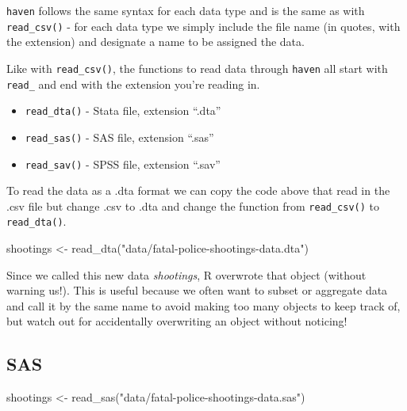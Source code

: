 \documentclass[
]{krantz}
\makeatletter
\newenvironment{Shaded}{\begin{snugshade}}{\end{snugshade}}
\newcommand{\FunctionTok}[1]{\textcolor[rgb]{0,0,0}{#1}}
\newcommand{\NormalTok}[1]{#1}
\newcommand{\OtherTok}[1]{\textcolor[rgb]{0.37,0.37,0.37}{#1}}
\newcommand{\StringTok}[1]{\textcolor[rgb]{0.5,0.5,0.5}{#1}}
\providecommand{\tightlist}{%
  \setlength{\itemsep}{0pt}\setlength{\parskip}{0pt}}
\newenvironment{kframe}{%
\medskip{}
\setlength{\fboxsep}{.8em}
 \def\at@end@of@kframe{}%
 \ifinner\ifhmode%
  \def\at@end@of@kframe{\end{minipage}}%
  \begin{minipage}{\columnwidth}%
 \fi\fi%
 \def\FrameCommand##1{\hskip\@totalleftmargin \hskip-\fboxsep
 \colorbox{shadecolor}{##1}\hskip-\fboxsep
     \hskip-\linewidth \hskip-\@totalleftmargin \hskip\columnwidth}%
 \MakeFramed {\advance\hsize-\width
   \@totalleftmargin\z@ \linewidth\hsize
   \@setminipage}}%
 {\par\unskip\endMakeFramed%
 \at@end@of@kframe}
\renewenvironment{Shaded}{\begin{kframe}}{\end{kframe}}
\makeatother
\begin{document}
\texttt{haven} follows the same syntax for each data type
and is the same as with \texttt{read\_csv()} - for each data
type we simply include the file name (in quotes, with the
extension) and designate a name to be assigned the data.

Like with \texttt{read\_csv()}, the functions to read data
through \texttt{haven} all start with \texttt{read\_} and
end with the extension you're reading in.

\begin{itemize}
\tightlist
\item
  \texttt{read\_dta()} - Stata file, extension ``.dta''
\item
  \texttt{read\_sas()} - SAS file, extension ``.sas''
\item
  \texttt{read\_sav()} - SPSS file, extension ``.sav''
\end{itemize}

To read the data as a .dta format we can copy the code above
that read in the .csv file but change .csv to .dta and
change the function from \texttt{read\_csv()} to
\texttt{read\_dta()}.

\begin{Shaded}
\begin{Highlighting}[]
\NormalTok{shootings }\OtherTok{\textless{}{-}} \FunctionTok{read\_dta}\NormalTok{(}\StringTok{"data/fatal{-}police{-}shootings{-}data.dta"}\NormalTok{)}
\end{Highlighting}
\end{Shaded}

Since we called this new data \emph{shootings}, R overwrote
that object (without warning us!). This is useful because we
often want to subset or aggregate data and call it by the
same name to avoid making too many objects to keep track of,
but watch out for accidentally overwriting an object without
noticing!

\hypertarget{sas}{%
\subsection{SAS}\label{sas}}

\begin{Shaded}
\begin{Highlighting}[]
\NormalTok{shootings }\OtherTok{\textless{}{-}} \FunctionTok{read\_sas}\NormalTok{(}\StringTok{"data/fatal{-}police{-}shootings{-}data.sas"}\NormalTok{)}
\end{Highlighting}
\end{Shaded}
\end{document}
